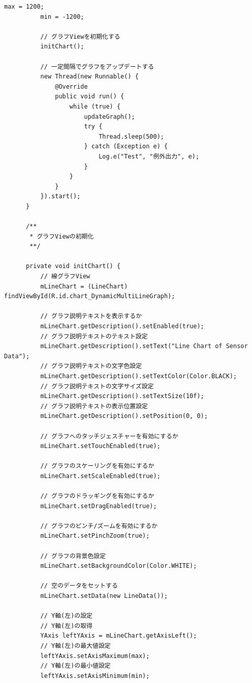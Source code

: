 \documentclass[dvipdfmx,autodetect-engine,titlepage]{jsarticle}
\begin{document}
\begin{lstlisting}[caption=MainActivity.jave,label=java]
          max = 1200;
          min = -1200;
  
          // グラフViewを初期化する
          initChart();
  
          // 一定間隔でグラフをアップデートする
          new Thread(new Runnable() {
              @Override
              public void run() {
                  while (true) {
                      updateGraph();
                      try {
                          Thread.sleep(500);
                      } catch (Exception e) {
                          Log.e("Test", "例外出力", e);
                      }
                  }
              }
          }).start();
      }
  
      /**
       * グラフViewの初期化
       **/
  
      private void initChart() {
          // 線グラフView
          mLineChart = (LineChart) findViewById(R.id.chart_DynamicMultiLineGraph);
  
          // グラフ説明テキストを表示するか
          mLineChart.getDescription().setEnabled(true);
          // グラフ説明テキストのテキスト設定
          mLineChart.getDescription().setText("Line Chart of Sensor Data");
          // グラフ説明テキストの文字色設定
          mLineChart.getDescription().setTextColor(Color.BLACK);
          // グラフ説明テキストの文字サイズ設定
          mLineChart.getDescription().setTextSize(10f);
          // グラフ説明テキストの表示位置設定
          mLineChart.getDescription().setPosition(0, 0);
  
          // グラフへのタッチジェスチャーを有効にするか
          mLineChart.setTouchEnabled(true);
  
          // グラフのスケーリングを有効にするか
          mLineChart.setScaleEnabled(true);
  
          // グラフのドラッギングを有効にするか
          mLineChart.setDragEnabled(true);
  
          // グラフのピンチ/ズームを有効にするか
          mLineChart.setPinchZoom(true);
  
          // グラフの背景色設定
          mLineChart.setBackgroundColor(Color.WHITE);
  
          // 空のデータをセットする
          mLineChart.setData(new LineData());
  
          // Y軸(左)の設定
          // Y軸(左)の取得
          YAxis leftYAxis = mLineChart.getAxisLeft();
          // Y軸(左)の最大値設定
          leftYAxis.setAxisMaximum(max);
          // Y軸(左)の最小値設定
          leftYAxis.setAxisMinimum(min);
  

\end{lstlisting}
\end{document}
